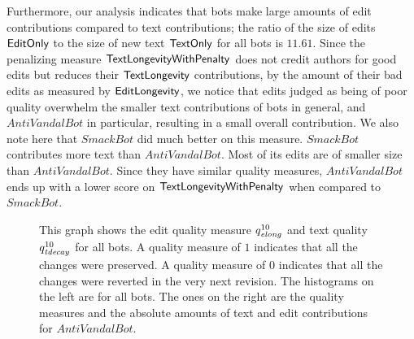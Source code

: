 Furthermore, our analysis indicates that bots make large amounts of
edit contributions compared to text contributions; the ratio
of the size of edits $\mathsf{EditOnly}$ to the size of new text $\mathsf{TextOnly}$
for all bots is $11.61$.
Since the penalizing measure $\mathsf{TextLongevityWithPenalty}$ does not credit authors for
good edits but reduces their $\mathsf{TextLongevity}$ contributions, by the 
amount of their bad edits as measured by $\mathsf{EditLongevity}$, we notice that 
edits judged as being of poor quality overwhelm the smaller text 
contributions of bots in general, and $AntiVandalBot$ in particular, 
resulting in a small overall contribution.
We also note here that $SmackBot$ did much better on this
measure.
$SmackBot$ contributes more text than $AntiVandalBot$.
Most of its edits are of smaller size than $AntiVandalBot$.
Since they have similar quality measures, $AntiVandalBot$ ends
up with a lower score on $\mathsf{TextLongevityWithPenalty}$ when compared to $SmackBot$.

%
\begin{figure}[tbhp]
    \begin{center}
    \end{center}
    \caption[Measuring edit and text quality for all bots and $AntiVandalBot$]{
    	This graph shows the edit quality measure $\quality{elong}{10}{}$
        and text quality $\quality{tdecay}{10}{}$ for all bots.
        A quality measure of $1$ indicates that all the changes
        were preserved.
        A quality measure of $0$ indicates that all the changes
        were reverted in the very next revision.
        The histograms on the left are for all bots.
        The ones on the right are the quality measures and the absolute amounts
        of text and edit contributions for $AntiVandalBot$.
    }
    \label{bot-contribs}
\end{figure}
